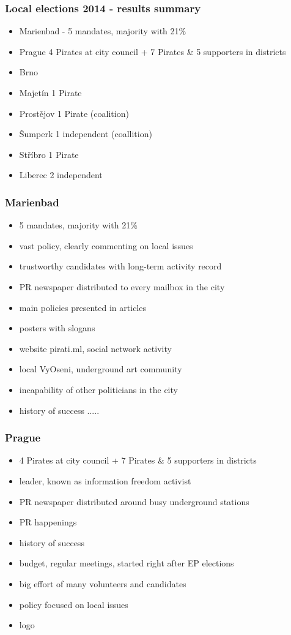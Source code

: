\begin{frame}
	\frametitle{Local elections 2014 - results summary}
	\begin{itemize}
	\item Marienbad - 5 mandates, majority with 21\%
	\item Prague 4 Pirates at city council + 7 Pirates \& 5 supporters in districts
	\item Brno
	\item Majet\'in 1 Pirate
	\item Prost\v{e}jov 1 Pirate (coalition)
	\item \v{S}umperk 1 independent (coallition)
	\item St\v{r}\'ibro 1 Pirate
	\item Liberec 2 independent
	\end{itemize}
\end{frame}
\begin{frame}
	\frametitle{Marienbad}
	\begin{itemize}
	\item 5 mandates, majority with 21\%
	\item vast policy, clearly commenting on local issues
	\item trustworthy candidates with long-term activity record
	\item PR newspaper distributed to every mailbox in the city
	\item main policies presented in articles
	\item posters with slogans
	\item website pirati.ml, social network activity
	\item local VyOseni, underground art community
	\item incapability of other politicians in the city
	\item history of success .....
	\end{itemize}
\end{frame}
\begin{frame}
	\frametitle{Prague}
	\begin{itemize}
		\item 4 Pirates at city council + 7 Pirates \& 5 supporters in districts
		\item leader, known as information freedom activist
		\item PR newspaper distributed around busy underground stations
		\item PR happenings
		\item history of success
		\item budget, regular meetings, started right after EP elections
		\item big effort of many volunteers and candidates
		\item policy focused on local issues
		\item logo %
	\end{itemize}
\end{frame}
